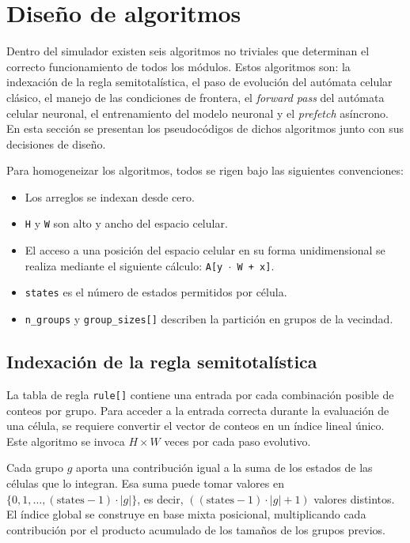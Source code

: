 \section{Diseño de algoritmos}

Dentro del simulador existen seis algoritmos no triviales que determinan el correcto funcionamiento de todos los módulos. Estos algoritmos son: la indexación de la regla semitotalística, el paso de evolución del autómata celular clásico, el manejo de las condiciones de frontera, el \textit{forward pass} del autómata celular neuronal, el entrenamiento del modelo neuronal y el \textit{prefetch} asíncrono. En esta sección se presentan los pseudocódigos de dichos algoritmos junto con sus decisiones de diseño.

Para homogeneizar los algoritmos, todos se rigen bajo las siguientes convenciones:
\begin{itemize}
    \item Los arreglos se indexan desde cero.
    \item \texttt{H} y \texttt{W} son alto y ancho del espacio celular.
    \item El acceso a una posición del espacio celular en su forma unidimensional se realiza mediante el siguiente cálculo: \texttt{A[y\,$\cdot$\,W + x]}.
    \item \texttt{states} es el número de estados permitidos por célula.
    \item \texttt{n\_groups} y \texttt{group\_sizes[]} describen la partición en grupos de la vecindad.
\end{itemize}

\subsection{Indexación de la regla semitotalística}

La tabla de regla \texttt{rule[]} contiene una entrada por cada combinación posible de conteos por grupo. Para acceder a la entrada correcta durante la evaluación de una célula, se requiere convertir el vector de conteos en un índice lineal único. Este algoritmo se invoca $H \times W$ veces por cada paso evolutivo.

Cada grupo $g$ aporta una contribución igual a la suma de los estados de las células que lo integran. Esa suma puede tomar valores en $\{0, 1, \dots, (\text{states}-1)\cdot|g|\}$, es decir, $((\text{states}-1)\cdot|g| + 1)$ valores distintos. El índice global se construye en base mixta posicional, multiplicando cada contribución por el producto acumulado de los tamaños de los grupos previos.

